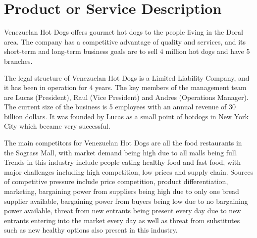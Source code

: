 

\section{Product or Service Description}\label{sec:prodservdes}
Venezuelan Hot Dogs offers gourmet hot dogs to the people living in the Doral area. The company has a competitive advantage of quality and services, and its short-term and long-term business goals are to sell 4 million hot dogs and have 5 branches. 

The legal structure of Venezuelan Hot Dogs is a Limited Liability Company, and it has been in operation for 4 years. The key members of the management team are Lucas (President), Raul (Vice President) and Andres (Operations Manager). The current size of the business is 5 employees with an annual revenue of 30 billion dollars. It was founded by Lucas as a small point of hotdogs in New York City which became very successful. 

The main competitors for Venezuelan Hot Dogs are all the food restaurants in the Sograss Mall, with market demand being high due to all malls being full. Trends in this industry include people eating healthy food and fast food, with major challenges including high competition, low prices and supply chain. Sources of competitive pressure include price competition, product differentiation, marketing, bargaining power from suppliers being high due to only one bread supplier available, bargaining power from buyers being low due to no bargaining power available, threat from new entrants being present every day due to new entrants entering into the market every day as well as threat from substitutes such as new healthy options also present in this industry. 

